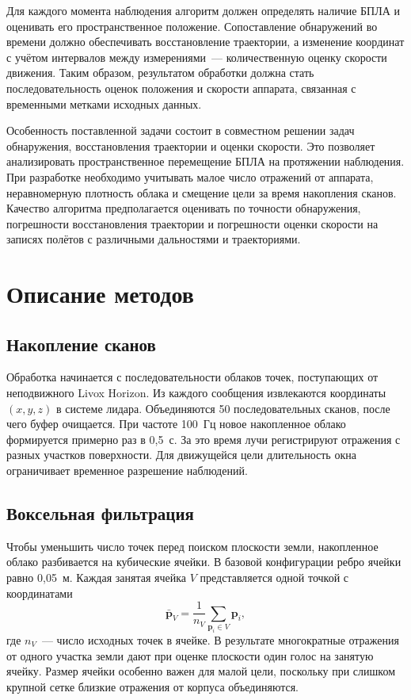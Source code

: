 \documentclass{misisarticle}
\begin{document}
Для каждого момента наблюдения алгоритм должен определять наличие БПЛА и оценивать его пространственное положение. Сопоставление обнаружений во времени должно обеспечивать восстановление траектории, а изменение координат с учётом интервалов между измерениями~--- количественную оценку скорости движения. Таким образом, результатом обработки должна стать последовательность оценок положения и скорости аппарата, связанная с временными метками исходных данных.

Особенность поставленной задачи состоит в совместном решении задач обнаружения, восстановления траектории и оценки скорости. Это позволяет анализировать пространственное перемещение БПЛА на протяжении наблюдения. При разработке необходимо учитывать малое число отражений от аппарата, неравномерную плотность облака и смещение цели за время накопления сканов. Качество алгоритма предполагается оценивать по точности обнаружения, погрешности восстановления траектории и погрешности оценки скорости на записях полётов с различными дальностями и траекториями.

\section{Описание методов}

\subsection{Накопление сканов}

Обработка начинается с последовательности облаков точек, поступающих от неподвижного Livox Horizon. Из каждого сообщения извлекаются координаты $(x,y,z)$ в системе лидара. Объединяются 50 последовательных сканов, после чего буфер очищается. При частоте 100~Гц новое накопленное облако формируется примерно раз в 0{,}5~с. За это время лучи регистрируют отражения с разных участков поверхности. Для движущейся цели длительность окна ограничивает временное разрешение наблюдений.

\subsection{Воксельная фильтрация}

Чтобы уменьшить число точек перед поиском плоскости земли, накопленное облако разбивается на кубические ячейки. В базовой конфигурации ребро ячейки равно 0{,}05~м. Каждая занятая ячейка $V$ представляется одной точкой с координатами
\begin{equation}
  \bar{\mathbf p}_V = \frac{1}{n_V}
  \sum_{\mathbf p_i \in V} \mathbf p_i ,
\end{equation}
где $n_V$~--- число исходных точек в ячейке. В результате многократные отражения от одного участка земли дают при оценке плоскости один голос на занятую ячейку. Размер ячейки особенно важен для малой цели, поскольку при слишком крупной сетке близкие отражения от корпуса объединяются.
\end{document}
